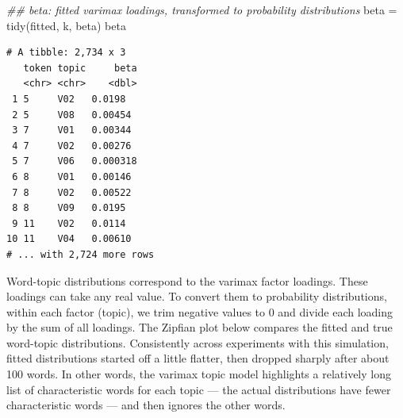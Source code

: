 \documentclass[
]{article}
\newenvironment{Shaded}{\begin{snugshade}}{\end{snugshade}}
\newcommand{\DocumentationTok}[1]{\textcolor[rgb]{0.37,0.37,0.37}{\textit{#1}}}
\newcommand{\FunctionTok}[1]{\textcolor[rgb]{0.28,0.35,0.67}{#1}}
\newcommand{\NormalTok}[1]{\textcolor[rgb]{0.00,0.23,0.31}{#1}}
\newcommand{\OtherTok}[1]{\textcolor[rgb]{0.00,0.23,0.31}{#1}}
\newcommand{\StringTok}[1]{\textcolor[rgb]{0.13,0.47,0.30}{#1}}
\begin{document}
\begin{Shaded}
\begin{Highlighting}[]
\DocumentationTok{\#\# beta: fitted varimax loadings, transformed to probability distributions}
\NormalTok{beta }\OtherTok{=} \FunctionTok{tidy}\NormalTok{(fitted, k, }\StringTok{\textquotesingle{}beta\textquotesingle{}}\NormalTok{)}
\NormalTok{beta}
\end{Highlighting}
\end{Shaded}

\begin{verbatim}
# A tibble: 2,734 x 3
   token topic     beta
   <chr> <chr>    <dbl>
 1 5     V02   0.0198  
 2 5     V08   0.00454 
 3 7     V01   0.00344 
 4 7     V02   0.00276 
 5 7     V06   0.000318
 6 8     V01   0.00146 
 7 8     V02   0.00522 
 8 8     V09   0.0195  
 9 11    V02   0.0114  
10 11    V04   0.00610 
# ... with 2,724 more rows
\end{verbatim}

Word-topic distributions correspond to the varimax factor loadings.
These loadings can take any real value. To convert them to probability
distributions, within each factor (topic), we trim negative values to 0
and divide each loading by the sum of all loadings. The Zipfian plot
below compares the fitted and true word-topic distributions.
Consistently across experiments with this simulation, fitted
distributions started off a little flatter, then dropped sharply after
about 100 words. In other words, the varimax topic model highlights a
relatively long list of characteristic words for each topic --- the
actual distributions have fewer characteristic words --- and then
ignores the other words.
\end{document}
